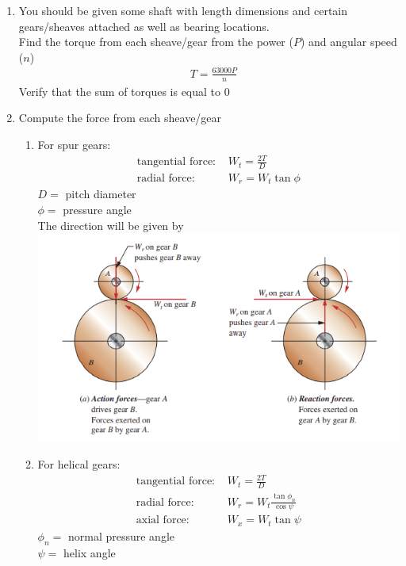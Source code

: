 \documentclass[11pt, fleqn]{article}
\begin{document}
\begin{enumerate}
    \item You should be given some shaft with length dimensions and certain gears/sheaves attached as well as bearing locations.\\
    Find the torque from each sheave/gear from the power ($P$) and angular speed ($n$)
    \begin{align*}
        &T=\frac{63000P}{n}
    \end{align*}
    Verify that the sum of torques is equal to 0
    \item Compute the force from each sheave/gear
    \begin{enumerate}
        \item For spur gears:
        \begin{align*}
            \text{tangential force: }&W_t=\frac{2T}{D}\\
            \text{radial force: }&W_r=W_t\tan\phi
        \end{align*}
        $D=$ pitch diameter\\
        $\phi=$ pressure angle\\
        The direction will be given by\\
        \includegraphics[scale=0.8]{Shafts/spurForces.png}
        \item For helical gears:
        \begin{align*}
            \text{tangential force: }&W_t=\frac{2T}{D}\\
            \text{radial force: }&W_r=W_t\frac{\tan\phi_n}{\cos\psi}\\
            \text{axial force: }&W_x=W_t\tan\psi
        \end{align*}
        $\phi_n=$ normal pressure angle\\
        $\psi=$ helix angle

\end{enumerate}
\end{enumerate}
\end{document}
